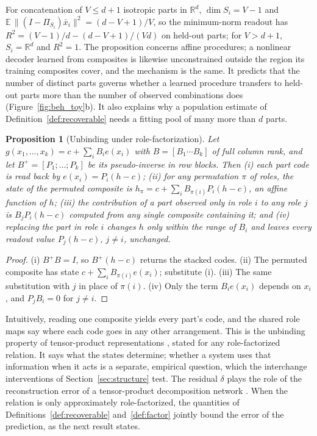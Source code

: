 \documentclass[10pt]{article}
\theoremstyle{plain}
\newtheorem{proposition}{Proposition}
\theoremstyle{remark}
\newcommand{\R}{\mathbb{R}}
\begin{document}
\noindent
For concatenation of $V \le d + 1$ isotropic parts in $\R^d$, $\dim S_i = V - 1$ and $\mathbb{E}\,\lVert(I - \Pi_{S_i})\bar{x}_i\rVert^2 = (d - V + 1)/V$, so the minimum-norm readout has $R^2 = (V-1)/d - (d - V + 1)/(Vd)$ on held-out parts; for $V > d + 1$, $S_i = \R^d$ and $R^2 = 1$. The proposition concerns affine procedures; a nonlinear decoder learned from composites is likewise unconstrained outside the region its training composites cover, and the mechanism is the same. It predicts that the number of distinct parts governs whether a learned procedure transfers to held-out parts more than the number of observed combinations does (Figure~\ref{fig:beh_toy}b). It also explains why a population estimate of Definition~\ref{def:recoverable} needs a fitting pool of many more than $d$ parts.



\noindent

\begin{proposition}[Unbinding under role-factorization]
\label{prop:systematic}
Let $g(x_1, \ldots, x_k) = c + \sum_i B_i e(x_i)$ with $B = [B_1 \cdots B_k]$ of full column rank, and let $B^{+} = [P_1; \ldots; P_k]$ be its pseudo-inverse in row blocks. Then (i) each part code is read back by $e(x_i) = P_i(h - c)$; (ii) for any permutation $\pi$ of roles, the state of the permuted composite is $h_\pi = c + \sum_i B_{\pi(i)} P_i (h - c)$, an affine function of $h$; (iii) the contribution of a part observed only in role $i$ to any role $j$ is $B_j P_i (h - c)$ computed from any single composite containing it; and (iv) replacing the part in role $i$ changes $h$ only within the range of $B_i$ and leaves every readout value $P_j(h - c)$, $j \ne i$, unchanged.
\end{proposition}

\begin{proof}
(i) $B^{+}B = I$, so $B^{+}(h - c)$ returns the stacked codes. (ii) The permuted composite has state $c + \sum_i B_{\pi(i)} e(x_i)$; substitute (i). (iii) The same substitution with $j$ in place of $\pi(i)$. (iv) Only the term $B_i e(x_i)$ depends on $x_i$, and $P_j B_i = 0$ for $j \neq i$.
\end{proof}

\noindent
Intuitively, reading one composite yields every part's code, and the shared role maps say where each code goes in any other arrangement. This is the unbinding property of tensor-product representations \citep{smolensky1990}, stated for any role-factorized relation. It says what the states determine; whether a system uses that information when it acts is a separate, empirical question, which the interchange interventions of Section~\ref{sec:structure} test. The residual $\delta$ plays the role of the reconstruction error of a tensor-product decomposition network \citep{mccoy2019}. When the relation is only approximately role-factorized, the quantities of Definitions~\ref{def:recoverable} and~\ref{def:factor} jointly bound the error of the prediction, as the next result states.
\end{document}
